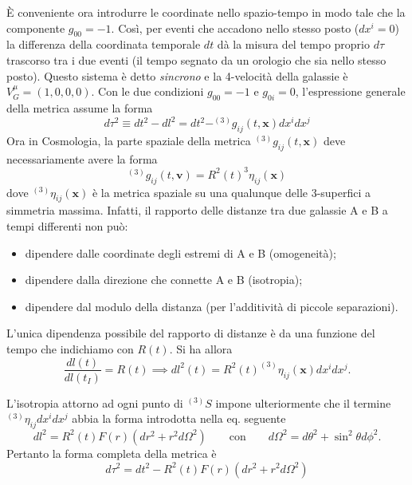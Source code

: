 È conveniente ora introdurre le coordinate nello spazio-tempo in modo tale che
la componente $g_{00}=-1$.  Così, per eventi che accadono nello stesso posto
($dx^i=0$) la differenza della coordinata temporale $dt$ dà la misura del tempo
proprio $d \tau$ trascorso tra i due eventi (il tempo segnato da un orologio che
sia nello stesso posto).  Questo sistema è detto \emph{sincrono} e la 4-velocità
della galassie è $V^{\mu}_G = (1,0,0,0)$.  Con le due condizioni $g_{00}=-1$ e
$g_{0i}=0$, l'espressione generale della metrica assume la forma
\begin{equation}
  d \tau^2 \equiv dt^2 -dl^2 = dt^2 - ^{(3)}g_{ij}(t,\bm x)  dx^i dx^j
\end{equation}
Ora in Cosmologia, la parte spaziale della metrica $^{(3)}g_{ij}(t,\bm x)$ deve
necessariamente avere la forma
\begin{equation}
  ^{(3)}g_{ij}(t,\bm v) = R^2(t) ^{3}\eta_{ij}(\bm x)
  \label{metrica_eta}
\end{equation}
dove $^{(3)}\eta_{ij}(\bm x)$ è la metrica spaziale su una qualunque delle
3-superfici a simmetria massima. Infatti, il rapporto delle distanze tra due
galassie A e B
a tempi differenti non può:
\begin{itemize}
\item dipendere dalle coordinate degli estremi di A e B (omogeneità);
\item dipendere dalla direzione che connette A e B (isotropia);
\item dipendere dal modulo della distanza (per l'additività di piccole
  separazioni).
\end{itemize}
L'unica dipendenza possibile del rapporto di distanze è da una funzione del
tempo che indichiamo con $R(t)$.  Si ha allora
\begin{equation}
  \frac{dl(t)} {dl(t_I)} = R(t) \implies  dl^2(t) = R^2(t)  ^{(3)}\eta_{ij}(\bm
  x) dx^i dx^j.
\end{equation}

L'isotropia attorno ad ogni punto di $^{(3)}S$ impone ulteriormente che il
termine $^{(3)}\eta_{ij} dx^i dx^j$ abbia la forma introdotta nella eq. seguente
\begin{equation}
  dl^2 = R^2(t) F(r) (dr^2 +r^2 d\Omega^2) \qquad\text{con}\qquad
  d\Omega^2 = d \theta^2 + \sin^2 \theta d\phi^2.
\end{equation}
Pertanto la forma completa della metrica è
\begin{equation}
  d \tau^2 = dt^2 -  R^2(t) F(r) (dr^2 +r^2 d\Omega^2)
  \label{forma_F(r)}
\end{equation}

